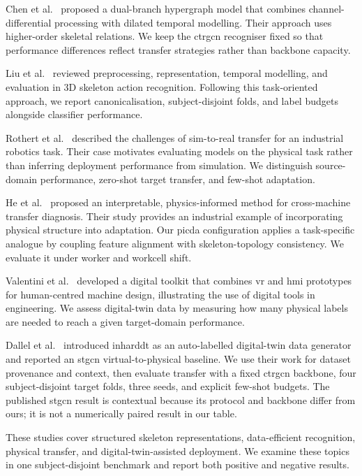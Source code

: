 \documentclass[3p,times,procedia]{elsarticle}
\begin{document}
Chen et al.~\cite{chen2025hypergraph} proposed a dual-branch hypergraph model
that combines channel-differential processing with dilated temporal modelling.
Their approach uses higher-order skeletal relations. We keep the \ac{ctrgcn}
recogniser fixed so that performance differences reflect transfer strategies
rather than backbone capacity.

Liu et al.~\cite{liu2025skeletonreview} reviewed preprocessing, representation,
temporal modelling, and evaluation in 3D skeleton action recognition. Following
this task-oriented approach, we report canonicalisation, subject-disjoint folds,
and label budgets alongside classifier performance.

Rothert et al.~\cite{rothert2024simtoreal} described the challenges of
sim-to-real transfer for an industrial robotics task. Their case motivates
evaluating models on the physical task rather than inferring deployment
performance from simulation. We distinguish source-domain performance,
zero-shot target transfer, and few-shot adaptation.

He et al.~\cite{he2024physicsinformed} proposed an interpretable,
physics-informed method for cross-machine transfer diagnosis. Their study
provides an industrial example of incorporating physical structure into
adaptation. Our \ac{picda} configuration applies a task-specific analogue by
coupling feature alignment with skeleton-topology consistency. We evaluate it
under worker and workcell shift.

Valentini et al.~\cite{valentini2025digital} developed a digital toolkit that
combines \ac{vr} and \ac{hmi} prototypes for human-centred machine design,
illustrating the use of digital tools in engineering. We assess digital-twin
data by measuring how many physical labels are needed to reach a given
target-domain performance.

Dallel et al.~\cite{dallel2023digital} introduced \acs{inharddt} as an
auto-labelled digital-twin data generator and reported an \ac{stgcn}
virtual-to-physical baseline. We use their work for dataset provenance and
context, then evaluate transfer with a fixed \ac{ctrgcn} backbone, four
subject-disjoint target folds, three seeds, and explicit few-shot budgets. The
published \acs{stgcn} result is contextual because its protocol and backbone
differ from ours; it is not a numerically paired result in our table.

These studies cover structured skeleton representations, data-efficient
recognition, physical transfer, and digital-twin-assisted deployment. We examine
these topics in one subject-disjoint benchmark and report both positive and
negative results.
\end{document}
